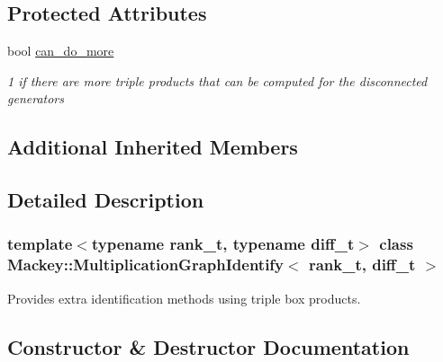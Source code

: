 \subsection*{Protected Attributes}
\begin{DoxyCompactItemize}
\item 
bool \hyperlink{classMackey_1_1MultiplicationGraphIdentify_a8356b59250ebac1ac30ebc7407bd352b}{can\+\_\+do\+\_\+more}
\begin{DoxyCompactList}\small\item\em 1 if there are more triple products that can be computed for the disconnected generators \end{DoxyCompactList}\end{DoxyCompactItemize}
\subsection*{Additional Inherited Members}


\subsection{Detailed Description}
\subsubsection*{template$<$typename rank\+\_\+t, typename diff\+\_\+t$>$\newline
class Mackey\+::\+Multiplication\+Graph\+Identify$<$ rank\+\_\+t, diff\+\_\+t $>$}

Provides extra identification methods using triple box products. 

\subsection{Constructor \& Destructor Documentation}
\mbox{\label{classMackey_1_1MultiplicationGraphIdentify_a14b3d3ea4be57324231fd206354fa627}} 
